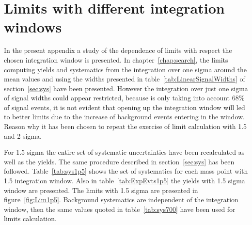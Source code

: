 \chapter{Limits with different integration windows}
\label{chap:windstudy}

In the present appendix a study of the dependence of limits with respect the chosen integration window is presented. In chapter~\ref{chap:search}, the limits computing yields and systematics from the integration over one sigma around the mean values and using the widths presented in table~\ref{tab:LinearSignalWidths} of section~\ref{sec:sys} have been presented. However the integration over just one sigma of signal widths could appear restricted, because is only taking into account 68\% of signal events, it is not evident that opening up the integration window will led to better limits due to the increase of background events entering in the window. Reason why it has been chosen to repeat the exercise of limit calculation with 1.5 and 2 sigma.

For 1.5 sigma the entire set of systematic uncertainties have been recalculated as well as the yields. The same procedure described in section~\ref{sec:sys} has been followed. Table~\ref{tab:sys1p5} shows the set of systematics for each mass point with 1.5 integration window. Also in table~\ref{tab:ExpEvts1p5} the yields with 1.5 sigma window are presented. The limits with 1.5 sigma are presented in figure~\ref{fig:Lim1p5}. Background systematics are independent of the integration window, then the same values quoted in table~\ref{tab:sys700} have been used for limits calculation.

